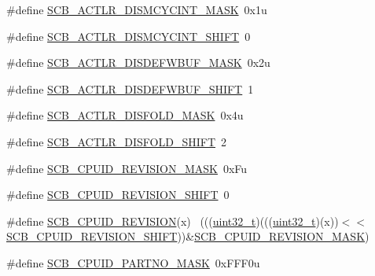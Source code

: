\begin{DoxyCompactItemize}
\item 
\#define \hyperlink{group___s_c_b___register___masks_gaae602d6292782f5741df72e5343d314a}{S\+C\+B\+\_\+\+A\+C\+T\+L\+R\+\_\+\+D\+I\+S\+M\+C\+Y\+C\+I\+N\+T\+\_\+\+M\+A\+SK}~0x1u
\item 
\#define \hyperlink{group___s_c_b___register___masks_gaa90446250553adb9c3d3825a1a2d2529}{S\+C\+B\+\_\+\+A\+C\+T\+L\+R\+\_\+\+D\+I\+S\+M\+C\+Y\+C\+I\+N\+T\+\_\+\+S\+H\+I\+FT}~0
\item 
\#define \hyperlink{group___s_c_b___register___masks_ga4c490bd1cf152dfc561b16ecd0c299b9}{S\+C\+B\+\_\+\+A\+C\+T\+L\+R\+\_\+\+D\+I\+S\+D\+E\+F\+W\+B\+U\+F\+\_\+\+M\+A\+SK}~0x2u
\item 
\#define \hyperlink{group___s_c_b___register___masks_gab4462053d8fad6812d5d1ac5c221bfb1}{S\+C\+B\+\_\+\+A\+C\+T\+L\+R\+\_\+\+D\+I\+S\+D\+E\+F\+W\+B\+U\+F\+\_\+\+S\+H\+I\+FT}~1
\item 
\#define \hyperlink{group___s_c_b___register___masks_gaf6db9bf675e72117781be485f701b7d0}{S\+C\+B\+\_\+\+A\+C\+T\+L\+R\+\_\+\+D\+I\+S\+F\+O\+L\+D\+\_\+\+M\+A\+SK}~0x4u
\item 
\#define \hyperlink{group___s_c_b___register___masks_gadd11de163d74ebcd19b1569980c26abc}{S\+C\+B\+\_\+\+A\+C\+T\+L\+R\+\_\+\+D\+I\+S\+F\+O\+L\+D\+\_\+\+S\+H\+I\+FT}~2
\item 
\#define \hyperlink{group___s_c_b___register___masks_ga85fcec5a1a285bf2ead09d715e7fd825}{S\+C\+B\+\_\+\+C\+P\+U\+I\+D\+\_\+\+R\+E\+V\+I\+S\+I\+O\+N\+\_\+\+M\+A\+SK}~0x\+Fu
\item 
\#define \hyperlink{group___s_c_b___register___masks_ga6c4bd208cc5af38612bf38b291f8312d}{S\+C\+B\+\_\+\+C\+P\+U\+I\+D\+\_\+\+R\+E\+V\+I\+S\+I\+O\+N\+\_\+\+S\+H\+I\+FT}~0
\item 
\#define \hyperlink{group___s_c_b___register___masks_gad84b7d9f172bb11a61e873c8316feaac}{S\+C\+B\+\_\+\+C\+P\+U\+I\+D\+\_\+\+R\+E\+V\+I\+S\+I\+ON}(x)                                    ~(((\hyperlink{_p_e___types_8h_a33594304e786b158f3fb30289278f5af}{uint32\+\_\+t})(((\hyperlink{_p_e___types_8h_a33594304e786b158f3fb30289278f5af}{uint32\+\_\+t})(x))$<$$<$\hyperlink{group___s_c_b___register___masks_ga6c4bd208cc5af38612bf38b291f8312d}{S\+C\+B\+\_\+\+C\+P\+U\+I\+D\+\_\+\+R\+E\+V\+I\+S\+I\+O\+N\+\_\+\+S\+H\+I\+FT}))\&\hyperlink{group___s_c_b___register___masks_ga85fcec5a1a285bf2ead09d715e7fd825}{S\+C\+B\+\_\+\+C\+P\+U\+I\+D\+\_\+\+R\+E\+V\+I\+S\+I\+O\+N\+\_\+\+M\+A\+SK})
\item 
\#define \hyperlink{group___s_c_b___register___masks_ga59f6aaadd9ecf7fed4e622ab8052f8d4}{S\+C\+B\+\_\+\+C\+P\+U\+I\+D\+\_\+\+P\+A\+R\+T\+N\+O\+\_\+\+M\+A\+SK}~0x\+F\+F\+F0u
$$
\end{DoxyCompactItemize}
